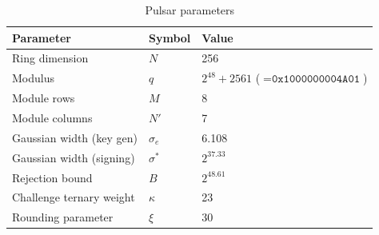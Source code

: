 \begin{table}[h]
\centering
\begin{tabular}{@{}lll@{}}
\toprule
\textbf{Parameter} & \textbf{Symbol} & \textbf{Value} \\
\midrule
Ring dimension & $N$ & 256 \\
Modulus & $q$ & $2^{48} + 2561$ ($= \texttt{0x1000000004A01}$) \\
Module rows & $M$ & 8 \\
Module columns & $N'$ & 7 \\
Gaussian width (key gen) & $\sigma_e$ & 6.108 \\
Gaussian width (signing) & $\sigma^*$ & $2^{37.33}$ \\
Rejection bound & $B$ & $2^{48.61}$ \\
Challenge ternary weight & $\kappa$ & 23 \\
Rounding parameter & $\xi$ & 30 \\
\bottomrule
\end{tabular}
\caption{Pulsar parameters}
\label{tab:params}
\end{table}

